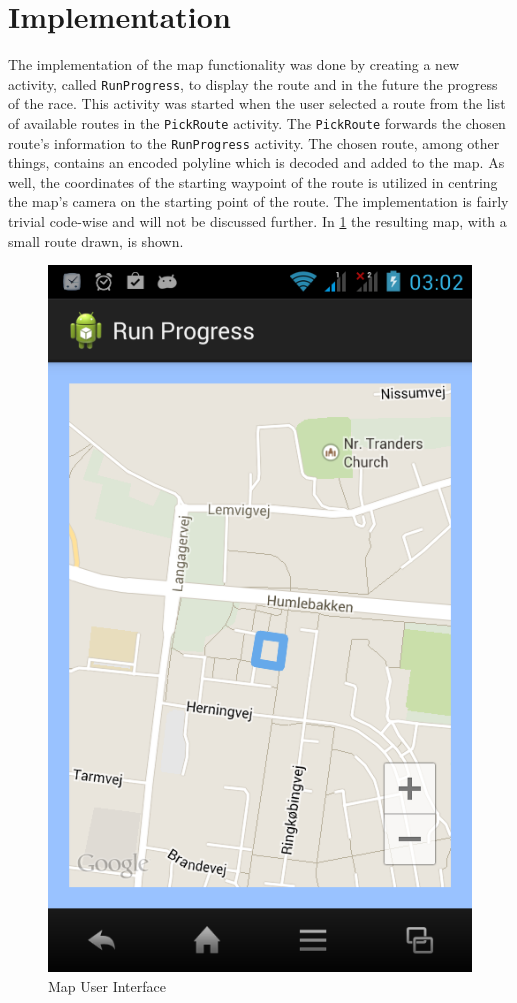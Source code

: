 \section{Implementation}
The implementation of the map functionality was done by creating a new activity, called \texttt{RunProgress}, to display the route and in the future the progress of the race. This activity was started when the user selected a route from the list of available routes in the \texttt{PickRoute} activity. The \texttt{PickRoute} forwards the chosen route's information to the \texttt{RunProgress} activity. The chosen route, among other things, contains an encoded polyline which is decoded and added to the map. As well, the coordinates of the starting waypoint of the route is utilized in centring the map's camera on the starting point of the route. The implementation is fairly trivial code-wise and will not be discussed further. In \ref{fig:runProgressV1} the resulting map, with a small route drawn, is shown.

\begin{figure}[ht]
\begin{center}
 \caption{Map User Interface}
 \label{fig:runProgressV1}
 \includegraphics[scale=0.4]{img/runProgressV1.png}
\end{center}
\end{figure}

